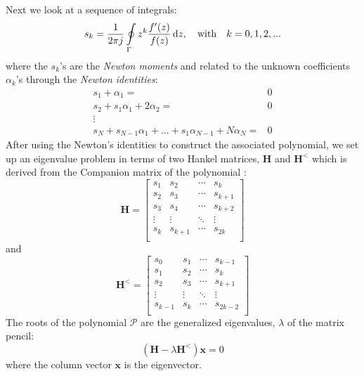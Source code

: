 \documentclass[11pt]{article}
\begin{document}
Next we look at a sequence of integrals:
%
\begin{equation}
  s_k = \frac{1}{2 \pi j} \oint \limits_{\Gamma} z^k \frac{f'(z)}{f(z)} \dif z, \quad \mathrm{with}\quad k = 0,1,2,...
  \label{eq:sk}
\end{equation}
%
where the $s_k$'s are the \emph{Newton moments} and related to the unknown coefficients $\alpha_k$'s through the \emph{Newton identities}:
%
\begin{equation}
  \begin{aligned}
    s_1 + \alpha_1 ={}& 0 \\
    s_2 + s_1 \alpha_1 + 2 \alpha_2 ={}& 0 \\
    {\vdots}\\
    s_N + s_{N-1} \alpha_{1} + ... + s_1 \alpha_{N-1} + N \alpha_N ={}& 0
    \label{eq:newtid}
  \end{aligned}
\end{equation}
%
After using the Newton's identities to construct the associated polynomial, we set up an eigenvalue problem in terms of two Hankel matrices, $\mathbf H$ and $\mathbf H^<$ which is derived from the Companion matrix of the polynomial \cite{Gillan2006c}:
%
\begin{equation}
  \mathbf H =
  \begin{bmatrix}
    s_1 & s_2 & \cdots & s_k \\
    s_2 & s_3 & \cdots & s_{k+1} \\
    s_3 & s_4 & \cdots & s_{k+2} \\
    \vdots & \vdots & \ddots & \vdots \\
    s_k & s_{k+1} & \cdots & s_{2k} \\
  \end{bmatrix}
  \label{eq:Hmat}
\end{equation}
%
and
%
\begin{equation}
  \mathbf H^< =
  \begin{bmatrix}
    s_0 & s_1 & \cdots & s_{k-1} \\
    s_1 & s_2 & \cdots & s_{k} \\
    s_2 & s_3 & \cdots & s_{k+1} \\
    \vdots & \vdots & \ddots & \vdots \\
    s_{k-1} & s_{k} & \cdots & s_{2k-2} \\
  \end{bmatrix}
  \label{eq:Hmat<}
\end{equation}
%
The roots of the polynomial $\mathcal P$ are the generalized eigenvalues, $\lambda$ of the matrix pencil:
%
\begin{equation}
  \left( \mathbf H - \lambda \mathbf H^< \right) \mathbf x = 0
  \label{eq:evp}
\end{equation}
%
where the column vector $\mathbf{x}$ is the eigenvector.
%
\end{document}
